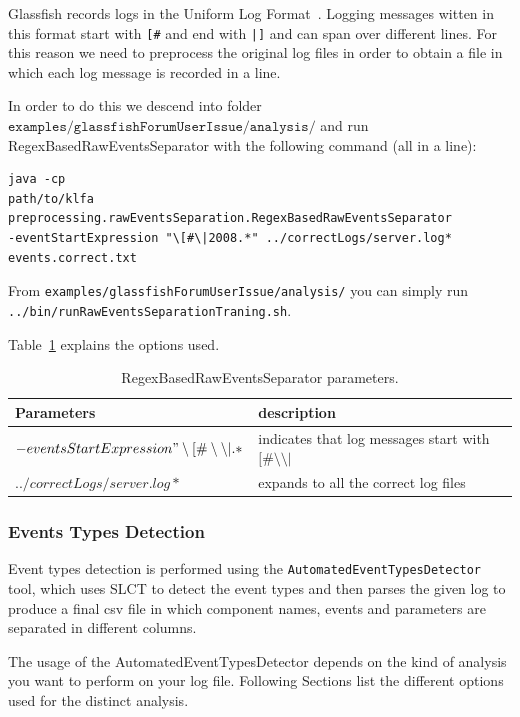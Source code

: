 Glassfish records logs in the Uniform Log Format~\cite{ulf}. Logging
messages witten in this format start with \texttt{[\#} and end with \texttt{|]}
and can span over different lines. For this reason we need to
preprocess the original log files in order to obtain a file in which
each log message is recorded in a line.

In order to do this we descend into folder \linebreak
$\texttt{examples/glassfishForumUserIssue/analysis/}$
and run RegexBasedRawEventsSeparator with the following
command (all in a line):


\begin{verbatim}
java -cp
path/to/klfa
preprocessing.rawEventsSeparation.RegexBasedRawEventsSeparator 
-eventStartExpression "\[#\|2008.*" ../correctLogs/server.log*
events.correct.txt
\end{verbatim}

From \texttt{examples/glassfishForumUserIssue/analysis/} you can simply run
\texttt{../bin/runRawEventsSeparationTraning.sh}.

Table~\ref{res} explains the options used.


\begin{table}
\label{res}
\caption{RegexBasedRawEventsSeparator parameters.}
\begin{tabular}{|p{8cm}|p{8cm}|}
\hline
 Parameters&description\\
\hline
$-eventsStartExpression "\setminus[\#\setminus\setminus|.*$
& indicates that log messages
 start with $[\#\setminus\setminus|$
\\
\hline
$ ../correctLogs/server.log*$& expands to all the correct log files\\
\hline
\end{tabular}

\end{table}


\subsubsection*{Events Types Detection}

Event types detection is performed using the
\texttt{AutomatedEventTypesDetector} tool, which uses SLCT to detect the
event types and then parses the given log to produce a final csv file
in which component names, events and parameters are separated in
different columns.

The usage of the AutomatedEventTypesDetector depends on the kind of
analysis you want to perform on your log file. Following Sections list the
different options used for the distinct analysis.




